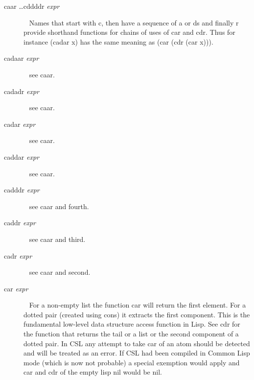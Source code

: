 \documentclass[a4paper,11pt]{article}
\begin{document}
\begin{description}
\item [{\ttfamily caar \ldots cddddr} {\itshape expr}]  ~\newline
Names that start with {\ttfamily c}, then have a sequence of
{\ttfamily a} or {\ttfamily d}s and finally {\ttfamily r} provide
shorthand functions for chains of uses of {\ttfamily car} and
{\ttfamily cdr}. Thus for instance
{\ttfamily (cadar x)} has the same meaning as
{\ttfamily (car (cdr (car x)))}.

\item[{\ttfamily cadaar} {\itshape expr}]  ~\newline
see {\ttfamily caar}.

\item[{\ttfamily cadadr} {\itshape expr}]  ~\newline
see {\ttfamily caar}.

\item[{\ttfamily cadar} {\itshape expr}]  ~\newline
see {\ttfamily caar}.

\item[{\ttfamily caddar} {\itshape expr}]  ~\newline
see {\ttfamily caar}.

\item[{\ttfamily cadddr} {\itshape expr}]  ~\newline
see {\ttfamily caar} and {\ttfamily fourth}.

\item[{\ttfamily caddr} {\itshape expr}]  ~\newline
see {\ttfamily caar} and {\ttfamily third}.

\item [{\ttfamily  cadr} {\itshape expr}]  ~\newline
see {\ttfamily caar} and {\ttfamily second}.

\item [{\ttfamily car} {\itshape expr}]  ~\newline
For a non-empty list the function {\ttfamily car} will return the
first element. For a dotted pair (created using {\ttfamily cons})
it extracts the first component. This is the fundamental low-level
data structure access function in Lisp. See {\ttfamily cdr} for the
function that returns the tail or a list or the second component of
a dotted pair. In CSL any attempt to take {\ttfamily car} of an atom
should be detected and will be treated as an error. If CSL had been
compiled in Common Lisp mode (which is now not probable) a special
exemption would apply and {\ttfamily car} and {\ttfamily cdr} of the
empty lisp {\ttfamily nil} would be {\ttfamily nil}.


\end{description}
\end{document}
